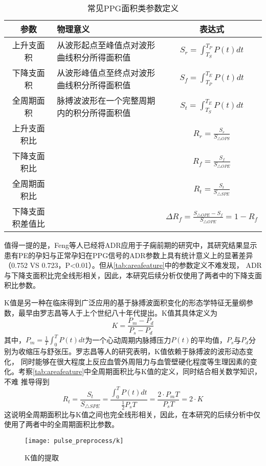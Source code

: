\begin{table}[htbp]
    \centering
    \caption{\label{tab:areafeature}常见PPG面积类参数定义}
    \begin{tabularx}{\linewidth}{cX<{\centering}c}
    \toprule
    \textbf{参数} & \textbf{物理意义} & \textbf{表达式} \\
    \midrule
    上升支面积      &  从波形起点至峰值点对波形曲线积分所得面积值         &  $S_r=\int_{T_S}^{T_P}P(t)dt$\\
    下降支面积      &  从波形峰值点至终点对波形曲线积分所得面积值         &  $S_f=\int_{T_P}^{T_E}P(t)dt$\\
    全周期面积      &  脉搏波波形在一个完整周期内的积分所得面积值         &  $S_t=\int_{T_S}^{T_E}P(t)dt$\\
    上升支面积比    &           &   $R_r=\frac{S_r}{S_{\triangle OPS}}$    \\
    下降支面积比    &           &   $R_f=\frac{S_f}{S_{\triangle OPE}}$    \\
    全周期面积比    &           &   $R_t=\frac{S_t}{S_{\triangle SPE}}$    \\
    下降支面积差值比&           &    $\Delta R_f=\frac{S_{\triangle OPE}-S_f}{S_{\triangle OPE}}=1-R_f$\\
    \bottomrule
    \end{tabularx}
\end{table}

值得一提的是，Feng等人已经将ADR应用于子痫前期的研究中，其研究结果显示患有PE的孕妇与正常孕妇在PPG信号的ADR参数上具有统计意义上的显著差异（0.752 VS 0.723，P<0.01）\cite{Feng2018}。但从\autoref{tab:areafeature}中的参数定义不难发现，
ADR与下降支面积比完全线形相关，因此，本研究后续分析仅使用了两者中的下降支面积比参数。

K值是另一种在临床得到广泛应用的基于脉搏波面积变化的形态学特征无量纲参数，最早由罗志昌等人于上个世纪八十年代提出\cite{Luo1988,PPGYY}。K值其具体定义为
\begin{equation}
    \label{equ:ppgk}
    K=\frac{P_m-P_d}{P_s-P_d}
\end{equation}
其中，$P_m=\frac{1}{T}\int_{0}^{T}P(t)dt$为一个心动周期内脉搏压力$P(t)$的平均值，$P_s$与$P_d$分别为收缩压与舒张压。罗志昌等人的研究表明，K值依赖于脉搏波的波形动态变化，
同时能够在很大程度上反应血管外周阻力与血管壁硬化程度等生理因素的变化。考察\autoref{tab:areafeature}中全周期面积比与K值的定义，同时结合相关数学知识，不难
推导得到
\begin{equation}
    \label{equ:kandart}
    R_t=\frac{S_t}{S_{\triangle SPE}}=\frac{\int_{0}^{T}P(t)dt}{\frac{1}{2}P_sT}=\frac{2\cdot P_mT}{P_sT}=2\cdot K
\end{equation}
这说明全周期面积比与K值之间也完全线形相关，因此，在本研究的后续分析中仅使用了两者中的全周期面积比参数。
\begin{figure}[htbp]
    \centering
    \texttt{[image: pulse\_preprocess/k]}
    \caption{\label{fig:k}K值的提取}
\end{figure}


